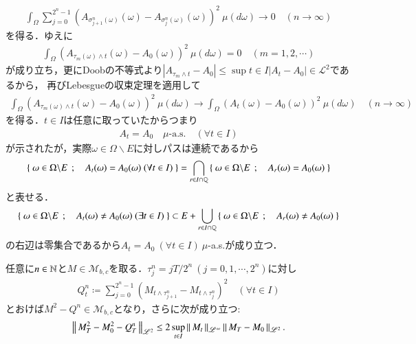 \begin{prf}
\begin{align}
			\int_\Omega \sum_{j=0}^{2^n-1} \left( A_{\sigma_{j+1}^n(\omega)}(\omega) - A_{\sigma_j^n(\omega)}(\omega) \right)^2\ \mu(d\omega) \longrightarrow 0 \quad (n \longrightarrow \infty)
		\end{align}
		を得る．ゆえに
		\begin{align}
			\int_\Omega \left( A_{\tau_m(\omega) \wedge t}(\omega) - A_{0}(\omega) \right)^2\ \mu(d\omega) = 0 \quad (m=1,2,\cdots)
		\end{align}
		が成り立ち，更にDoobの不等式より$|A_{\tau_m \wedge t} - A_{0}| \leq \sup{t \in I}{|A_t - A_{0}|} \in \mathscr{L}^2$であるから，
		再びLebesgueの収束定理を適用して
		\begin{align}
			\int_\Omega \left( A_{\tau_m(\omega) \wedge t}(\omega) - A_{0}(\omega) \right)^2\ \mu(d\omega)
			\longrightarrow \int_\Omega \left( A_t(\omega) - A_{0}(\omega) \right)^2\ \mu(d\omega) \quad (n \longrightarrow \infty)
		\end{align}
		を得る．$t \in I$は任意に取っていたからつまり
		\begin{align}
			A_t = A_0 \quad \mbox{$\mu$-a.s.} \quad (\forall t \in I)
		\end{align}
		が示されたが，実際$\omega \in \Omega \backslash E$に対しパスは連続であるから
		\begin{align}
			\left\{\ \omega \in \Omega \backslash E\ \, ; \quad A_t(\omega) = A_0(\omega)\ (\forall t \in I)\ \right\}
			= \bigcap_{r \in I \cap \mathbb{Q}} \left\{\ \omega \in \Omega \backslash E\ \, ; \quad A_r(\omega) = A_0(\omega)\ \right\}
		\end{align}
		と表せる．
		\begin{align}
			\left\{\ \omega \in \Omega \backslash E\ \, ; \quad A_t(\omega) \neq A_0(\omega)\ (\exists t \in I)\ \right\}
			\subset E + \bigcup_{r \in I \cap \mathbb{Q}} \left\{\ \omega \in \Omega \backslash E\ \, ; \quad A_r(\omega) \neq A_0(\omega)\ \right\}
		\end{align}
		の右辺は零集合であるから$A_t = A_0\ (\forall t \in I)\ $$\mu$-a.s.が成り立つ．
		\QED
	\end{prf}
	
	\begin{screen}
		\begin{lem}[二次変分補題]
			任意に$n \in \mathbb{N}$と$M \in \mathcal{M}_{b,c}$を取る．$\tau_j^n = jT/2^n\ (j=0,1,\cdots,2^n)$に対し
			\begin{align}
				Q_t^n \coloneqq \sum_{j=0}^{2^n-1} \left( M_{t \wedge \tau_{j+1}^n} - M_{t \wedge \tau_j^n} \right)^2 \quad (\forall t \in I)
				\label{eq:lem_quadratic_variation_0}
			\end{align}
			とおけば$M^2 - Q^n \in \mathcal{M}_{b,c}$となり，さらに次が成り立つ:
			\begin{align}
				\left\|\, M_T^2 - M_0^2 - Q_T^n\, \right\|_{\mathscr{L}^2} \leq 2 \operatorname*{sup}_{t \in I} \left\|\, M_t\, \right\|_{\mathscr{L}^\infty} \left\|\, M_T - M_0\, \right\|_{\mathscr{L}^2}.
			\end{align}
			\label{lem:quadratic_variation}
		\end{lem}
	\end{screen}
	
